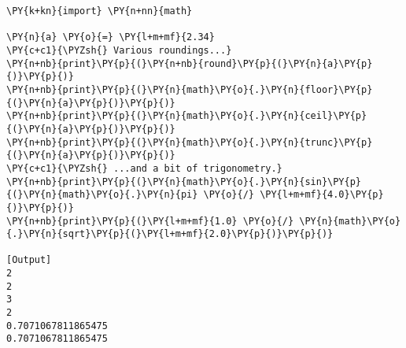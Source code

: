 \begin{Verbatim}[label=\makebox{\href{https://bitbucket.org/lbaldini/statnotes/src/master/snippets/rounding.py}{https://bitbucket.org/.../rounding.py}},commandchars=\\\{\}]
\PY{k+kn}{import} \PY{n+nn}{math}

\PY{n}{a} \PY{o}{=} \PY{l+m+mf}{2.34}
\PY{c+c1}{\PYZsh{} Various roundings...}
\PY{n+nb}{print}\PY{p}{(}\PY{n+nb}{round}\PY{p}{(}\PY{n}{a}\PY{p}{)}\PY{p}{)}
\PY{n+nb}{print}\PY{p}{(}\PY{n}{math}\PY{o}{.}\PY{n}{floor}\PY{p}{(}\PY{n}{a}\PY{p}{)}\PY{p}{)}
\PY{n+nb}{print}\PY{p}{(}\PY{n}{math}\PY{o}{.}\PY{n}{ceil}\PY{p}{(}\PY{n}{a}\PY{p}{)}\PY{p}{)}
\PY{n+nb}{print}\PY{p}{(}\PY{n}{math}\PY{o}{.}\PY{n}{trunc}\PY{p}{(}\PY{n}{a}\PY{p}{)}\PY{p}{)}
\PY{c+c1}{\PYZsh{} ...and a bit of trigonometry.}
\PY{n+nb}{print}\PY{p}{(}\PY{n}{math}\PY{o}{.}\PY{n}{sin}\PY{p}{(}\PY{n}{math}\PY{o}{.}\PY{n}{pi} \PY{o}{/} \PY{l+m+mf}{4.0}\PY{p}{)}\PY{p}{)}
\PY{n+nb}{print}\PY{p}{(}\PY{l+m+mf}{1.0} \PY{o}{/} \PY{n}{math}\PY{o}{.}\PY{n}{sqrt}\PY{p}{(}\PY{l+m+mf}{2.0}\PY{p}{)}\PY{p}{)}

[Output]
2
2
3
2
0.7071067811865475
0.7071067811865475
\end{Verbatim}